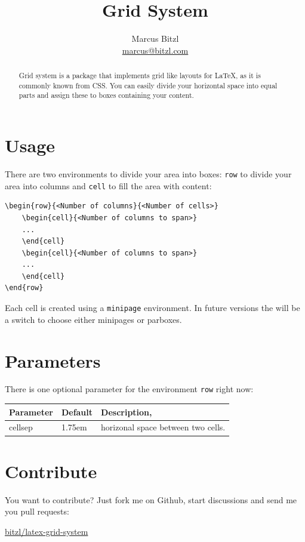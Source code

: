 \documentclass[DIV13,a4paper]{scrartcl}
\title{Grid System}
\author{Marcus Bitzl\\ \url{marcus@bitzl.com}}
\begin{document}
\maketitle

\begin{abstract}
Grid system is a package that implements grid like layouts for \LaTeX, as it is commonly known from CSS. You can easily divide your horizontal space into equal parts and assign these to boxes containing your content.
\end{abstract}

\section{Usage}
There are two environments to divide your area into boxes: \texttt{row} to divide your area into columns and \texttt{cell} to fill the area with content:

\medskip

\begin{lstlisting}
\begin{row}{<Number of columns}{<Number of cells>}
	\begin{cell}{<Number of columns to span>}
	...
	\end{cell}
	\begin{cell}{<Number of columns to span>}
	...
	\end{cell}
\end{row}
\end{lstlisting}

Each cell is created using a \texttt{minipage} environment. In future versions the will be a switch to choose either minipages or parboxes.

\section{Parameters}
There is one optional parameter for the environment \texttt{row} right now:

\medskip

\begin{tabularx}{\linewidth}{llX}\toprule
\textbf{Parameter} & \textbf{Default} & \textbf{Description},\\ \midrule
cellsep & 1.75em & horizonal space between two cells.\\\bottomrule
\end{tabularx}

\section{Contribute}
You want to contribute? Just fork me on Github, start discussions and send me you pull requests: 
\begin{center}
	\href{https://github.com/bitzl/latex-grid-system}{\ttfamily bitzl/latex-grid-system}
\end{center}
	
\end{document}
